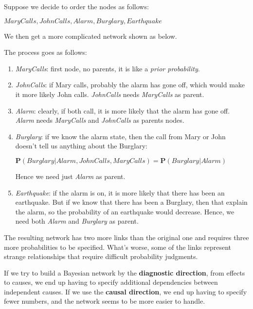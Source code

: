 \begin{example}
    Suppose we decide to
    order the nodes as follows:
    \begin{center}
        $MaryCalls, JohnCalls, Alarm, Burglary, Earthquake$
    \end{center}
    We then get a more complicated network shown as below.
    \begin{center}
    \end{center}
    The process goes as follows:
    \begin{enumerate}
        \item \textit{MaryCalls}: first node, no parents, it is like a \textit{prior probability}.
        \item \textit{JohnCalls}: if Mary calls, probably the alarm has gone off, which would make it more likely John calls. \textit{JohnCalls} needs \textit{MaryCalls} as parent.
        \item \textit{Alarm}: clearly, if both call, it is more likely that the alarm has gone off. \textit{Alarm} needs \textit{MaryCalls} and \textit{JohnCalls} as parents nodes.
        \item \textit{Burglary}: if we know the alarm state, then the call from Mary or John doesn't tell us anything about the Burglary: 
        \begin{center}
            $\mathbf{P}(Burglary|Alarm, JohnCalls, MaryCalls) = \mathbf{P}(Burglary|Alarm)$    
        \end{center}
        Hence we need just \textit{Alarm} as parent.
        \item \textit{Earthquake}: if the alarm is on, it is more likely that there has been an earthquake. But if we know that there has been a Burglary, then that explain the alarm, so the probability of an earthquake would decrease. Hence, we need both \textit{Alarm} and \textit{Burglary} as parent.
    \end{enumerate} \vspace{3.5pt}

    The resulting network has two more links than the original one and requires three more probabilities to be specified. What's worse, some of the links represent strange relationships
    that require difficult probability judgments. 
\end{example}
If we try to build a Bayesian network by the \textbf{diagnostic direction}, from effects to causes, we end up having to specify additional dependencies between independent causes. If we use the \textbf{causal direction}, we end up having to 
specify fewer numbers, and the network seems to be more easier to handle.